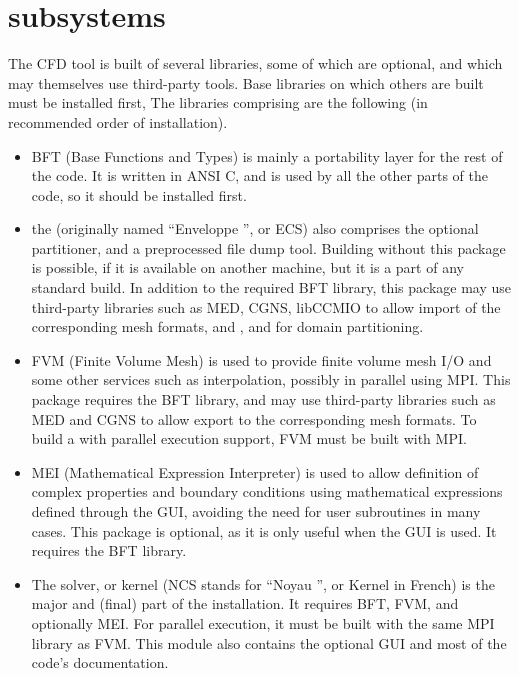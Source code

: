 \documentclass[a4paper,10pt,twoside]{article}
\begin{document}
\def\contentsname{\textbf{\normalsize TABLE OF CONTENTS}\pdfbookmark[1]{Table of
contents}{contents}}

\large
\makepdgCS
\normalsize

\passepage

\begin{center}\begin{singlespace}
\tableofcontents
\end{singlespace}\end{center}

\section{\CS subsystems\label{sec:subsystems}}

The \CS CFD tool is built of several libraries, some of which are optional,
and which may themselves use third-party tools.
Base libraries on which others are built must be installed first,
The libraries comprising \CS are the following (in recommended
order of installation).

\begin{itemize}
\item BFT (Base Functions and Types) is mainly a portability layer
      for the rest of the code. It is written in ANSI C, and is used by
      all the other parts of the code, so it should be installed first.
\item the \pcs (originally named ``Enveloppe \CS'', or ECS) also comprises
      the optional partitioner, and a preprocessed file dump tool.
      Building \CS without this package is possible, if it is available
      on another machine, but it is a part of any standard build.
      In addition to the required BFT library, this package may use
      third-party libraries such as MED, CGNS, libCCMIO to allow import of
      the corresponding mesh formats, and \metis, and \scotch for
      domain partitioning.
\item FVM (Finite Volume Mesh) is used to provide finite volume mesh
      I/O and some other services such as interpolation, possibly in
      parallel using MPI. This package requires the BFT library,
      and may use third-party libraries such as MED and CGNS
      to allow export to the corresponding mesh formats. To build a
      \CS with parallel execution support, FVM must be built with MPI.
\item MEI (Mathematical Expression Interpreter) is used to allow
      definition of complex properties and boundary conditions using
      mathematical expressions defined through the GUI, avoiding
      the need for user subroutines in many cases. This package
      is optional, as it is only useful when the GUI is used.
      It requires the BFT library.
\item The \CS solver, or kernel (NCS stands for ``Noyau \CS'', or
      \CS Kernel in French) is the major and (final) part of the
      installation. It requires BFT, FVM, and optionally MEI.
      For parallel execution, it must be built with the same MPI library
      as FVM.
      This module also contains the optional GUI and most of the code's
      documentation.
\end{itemize}
\end{document}

